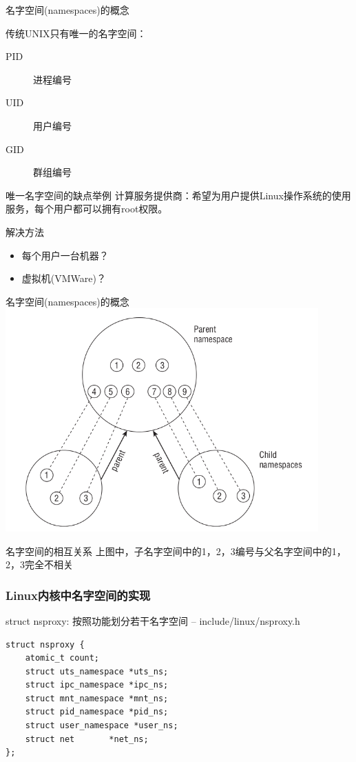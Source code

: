 \documentclass[xcolor=svgnames]{beamer}
\begin{document}
\begin{CJK*}{UTF8}{gbsn}
\begin{frame}{名字空间(namespaces)的概念}

传统UNIX只有唯一的名字空间：

\begin{description}
\item[PID] 进程编号
\item[UID] 用户编号
\item[GID] 群组编号
\end{description}

\begin{block}{唯一名字空间的缺点举例}
计算服务提供商：希望为用户提供Linux操作系统的使用服务，每个用户都可以拥有root权限。
\end{block}

\begin{block}{解决方法}
\begin{itemize}
\item 每个用户一台机器？
\item 虚拟机(VMWare)？
\end{itemize}
\end{block}

\end{frame}

\begin{frame}{名字空间(namespaces)的概念}
\includegraphics[width=0.9\textwidth]{ns.png}
\begin{block}{名字空间的相互关系}
上图中，子名字空间中的1，2，3编号与父名字空间中的1，2，3完全不相关
\end{block}
\end{frame}

\begin{frame}[fragile]
\frametitle{Linux内核中名字空间的实现}
\begin{block}{struct nsproxy: 按照功能划分若干名字空间 -- include/linux/nsproxy.h}
\begin{verbatim}
struct nsproxy {
    atomic_t count;
    struct uts_namespace *uts_ns;
    struct ipc_namespace *ipc_ns;
    struct mnt_namespace *mnt_ns;
    struct pid_namespace *pid_ns;
    struct user_namespace *user_ns;
    struct net       *net_ns;
};
\end{verbatim}
\end{block}
\end{frame}


\end{CJK*}
\end{document}
